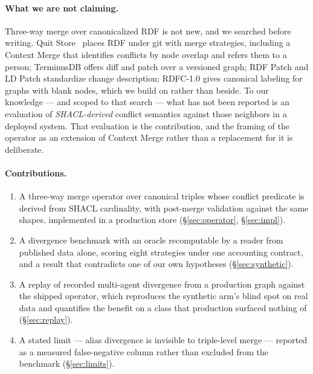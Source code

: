 \paragraph{What we are not claiming.} Three-way merge over canonicalized RDF is
not new, and we searched before writing. Quit Store~\cite{arndt2019quit} places
RDF under git with merge strategies, including a Context Merge that identifies
conflicts by node overlap and refers them to a person; TerminusDB offers diff and patch over a versioned graph; RDF
Patch and LD Patch standardize change description; RDFC-1.0 gives canonical
labeling for graphs with blank nodes, which we build on rather than beside. To
our knowledge --- and scoped to that search --- what has not been reported is an
evaluation of \emph{SHACL-derived} conflict semantics against those neighbors
in a deployed system. That evaluation is the contribution, and the framing of
the operator as an extension of Context Merge rather than a replacement for it
is deliberate.

\paragraph{Contributions.}
\begin{enumerate}[leftmargin=*,itemsep=2pt]
  \item A three-way merge operator over canonical triples whose conflict
        predicate is derived from SHACL cardinality, with post-merge validation
        against the same shapes, implemented in a production store
        (\S\ref{sec:operator}, \S\ref{sec:impl}).
  \item A divergence benchmark with an oracle recomputable by a reader from
        published data alone, scoring eight strategies under one accounting
        contract, and a result that contradicts one of our own hypotheses
        (\S\ref{sec:synthetic}).
  \item A replay of recorded multi-agent divergence from a production graph
        against the shipped operator, which reproduces the synthetic arm's
        blind spot on real data and quantifies the benefit on a class that
        production surfaced nothing of (\S\ref{sec:replay}).
  \item A stated limit --- alias divergence is invisible to triple-level merge
        --- reported as a measured false-negative column rather than excluded
        from the benchmark (\S\ref{sec:limits}).
\end{enumerate}
